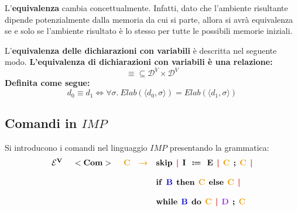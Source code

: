 \documentclass[a4paper]{article}
\begin{document}
 	\noindent
 	L'\textbf{equivalenza} cambia concettualmente. Infatti, dato che l'ambiente risultante dipende potenzialmente dalla memoria da cui si parte, allora si avrà equivalenza se e solo se l'ambiente risultato è lo stesso per tutte le possibili memorie iniziali.
 	
 	\begin{boxdef}
 		L'\textcolor{Red3}{\textbf{equivalenza delle dichiarazioni con variabili}} è descritta nel seguente modo. \textbf{L'equivalenza di dichiarazioni con variabili è una relazione:}
 		\begin{equation*}
 			\equiv \subseteq \mathcal{D}^{V} \times \mathcal{D}^{V}
 		\end{equation*}
 		\textbf{Definita come segue:}
 		\begin{equation*}
 			d_{0} \equiv d_{1} \iff \forall \sigma. \: Elab\left(\langle d_{0},\sigma \rangle\right) = Elab\left(\langle d_{1},\sigma \rangle\right)
 		\end{equation*}
 	\end{boxdef}\newpage
 	
 	\subsection{Comandi in $IMP$}
 	
 	Si introducono i comandi nel linguaggio $IMP$ presentando la grammatica:
 	\begin{equation*}
 		\begin{array}{lll}
 			\mathbf{\mathcal{E}^{V}}  \hspace{1.5em} \mathbf{<Com>} \hspace{1.5em} \textcolor{Orange2}{\mathbf{C}} & \textcolor{Orange2}{\boldsymbol{\rightarrow}} & \mathbf{skip} \:\: \textcolor{Red3}{\boldsymbol{|}} \:\: \mathbf{I} \:\: \boldsymbol{\coloneq} \:\: \mathbf{E} \:\: \textcolor{Red3}{\boldsymbol{|}} \:\: \textcolor{Orange2}{\mathbf{C}} \:\: \boldsymbol{;} \:\: \textcolor{Orange2}{\mathbf{C}} \:\: \textcolor{Red3}{\boldsymbol{|}} \\
 			\\
 			&& \mathbf{if} \:\: \textcolor{Blue3}{\mathbf{B}} \:\: \mathbf{then} \:\: \textcolor{Orange2}{\mathbf{C}} \:\: \mathbf{else} \:\: \textcolor{Orange2}{\mathbf{C}} \:\: \textcolor{Red3}{\boldsymbol{|}} \\
 			\\
 			&& \mathbf{while} \:\: \textcolor{Blue3}{\mathbf{B}} \:\: \mathbf{do} \:\: \textcolor{Orange2}{\mathbf{C}} \:\: \textcolor{Red3}{\boldsymbol{|}} \:\: \textcolor{Purple2}{\mathbf{D}} \:\: \boldsymbol{;} \:\: \textcolor{Orange2}{\mathbf{C}}
 		\end{array}
 	\end{equation*}
 	
\end{document}
